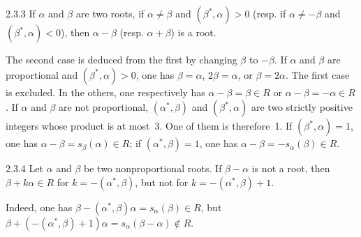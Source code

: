 \begin{corollary}{2.3.3}\label{XXI.2.3.3}
If $\alpha$ and $\beta$ are two roots, if $\alpha\ne\beta$ and $(\beta^*,\alpha)>0$ (resp. if $\alpha\ne-\beta$ and $(\beta^*,\alpha)<0$), then $\alpha-\beta$ (resp. $\alpha+\beta$) is a root.
\end{corollary}
The second case is deduced from the first by changing $\beta$ to $-\beta$. If $\alpha$ and $\beta$ are proportional and $(\beta^*,\alpha)>0$, one has $\beta=\alpha$, $2\beta=\alpha$, or $\beta=2\alpha$. The first case is excluded. In the others, one respectively has $\alpha-\beta=\beta\in R$ or $\alpha-\beta=-\alpha\in R$. If $\alpha$ and $\beta$ are not proportional, $(\alpha^*,\beta)$ and $(\beta^*,\alpha)$ are two strictly positive integers whose product is at most~3. One of them is therefore~1. If $(\beta^*,\alpha)=1$, one has $\alpha-\beta=s_\beta(\alpha)\in R$; if $(\alpha^*,\beta)=1$, one has $\alpha-\beta=-s_\alpha(\beta)\in R$.

\begin{lemma}{2.3.4}\label{XXI.2.3.4}
Let $\alpha$ and $\beta$ be two nonproportional roots. If $\beta-\alpha$ is not a root, then $\beta+k\alpha\in R$ for $k=-(\alpha^*,\beta)$, but not for $k=-(\alpha^*,\beta)+1$.
\end{lemma}
Indeed, one has $\beta-(\alpha^*,\beta)\alpha=s_\alpha(\beta)\in R$, but $\beta+(-(\alpha^*,\beta)+1)\alpha=s_\alpha(\beta-\alpha)\notin R$.

